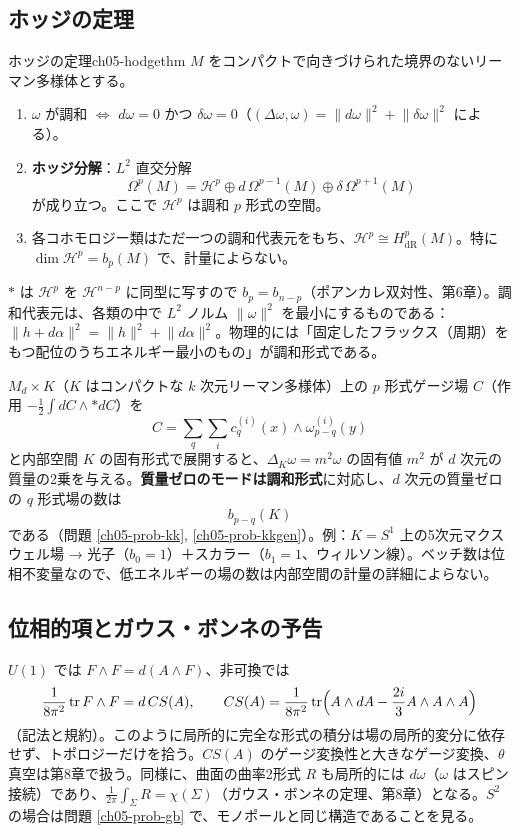 \subsection{ホッジの定理}
\begin{mythm}{ホッジの定理}{ch05-hodgethm}
$M$ をコンパクトで向きづけられた境界のないリーマン多様体とする。
\begin{enumerate}
\item $\omega$ が調和 $\iff$ $d\omega=0$ かつ $\delta\omega=0$（$(\Delta\omega,\omega)=\lVert d\omega\rVert^2+\lVert\delta\omega\rVert^2$ による）。
\item \textbf{ホッジ分解}：$L^2$ 直交分解
\[
\Omega^p(M)=\mathcal H^p\oplus d\,\Omega^{p-1}(M)\oplus\delta\,\Omega^{p+1}(M)
\]
が成り立つ。ここで $\mathcal H^p$ は調和 $p$ 形式の空間。
\item 各コホモロジー類はただ一つの調和代表元をもち、$\mathcal H^p\cong H^p_{\mathrm{dR}}(M)$。特に $\dim\mathcal H^p=b_p(M)$ で、計量によらない。
\end{enumerate}
\end{mythm}
${*}$ は $\mathcal H^p$ を $\mathcal H^{n-p}$ に同型に写すので $b_p=b_{n-p}$（ポアンカレ双対性、第6章）。調和代表元は、各類の中で $L^2$ ノルム $\lVert\omega\rVert^2$ を最小にするものである：$\lVert h+d\alpha\rVert^2=\lVert h\rVert^2+\lVert d\alpha\rVert^2$。物理的には「固定したフラックス（周期）をもつ配位のうちエネルギー最小のもの」が調和形式である。

\begin{physbox}
$M_d\times K$（$K$ はコンパクトな $k$ 次元リーマン多様体）上の $p$ 形式ゲージ場 $C$（作用 $-\tfrac12\int dC\wedge{*dC}$）を
\[
C=\sum_{q}\sum_{i} c^{(i)}_q(x)\wedge\omega^{(i)}_{p-q}(y)
\]
と内部空間 $K$ の固有形式で展開すると、$\Delta_K\omega=m^2\omega$ の固有値 $m^2$ が $d$ 次元の質量の2乗を与える。\textbf{質量ゼロのモードは調和形式}に対応し、$d$ 次元の質量ゼロの $q$ 形式場の数は
\[
b_{p-q}(K)
\]
である（問題 \ref{ch05-prob-kk}, \ref{ch05-prob-kkgen}）。例：$K=S^1$ 上の5次元マクスウェル場 → 光子（$b_0=1$）＋スカラー（$b_1=1$、ウィルソン線）。ベッチ数は位相不変量なので、低エネルギーの場の数は内部空間の計量の詳細によらない。
\end{physbox}

\subsection{位相的項とガウス・ボンネの予告}
$U(1)$ では $F\wedge F=d(A\wedge F)$、非可換では
\[
\frac{1}{8\pi^2}\tr F\wedge F=d\,CS(A),\qquad CS(A)=\frac{1}{8\pi^2}\tr\Bigl(A\wedge dA-\frac{2i}{3}A\wedge A\wedge A\Bigr)
\]
（記法と規約）。このように局所的に完全な形式の積分は場の局所的変分に依存せず、トポロジーだけを拾う。$CS(A)$ のゲージ変換性と大きなゲージ変換、$\theta$ 真空は第8章で扱う。同様に、曲面の曲率2形式 $R$ も局所的には $d\omega$（$\omega$ はスピン接続）であり、$\frac{1}{2\pi}\int_\Sigma R=\chi(\Sigma)$（ガウス・ボンネの定理、第8章）となる。$S^2$ の場合は問題 \ref{ch05-prob-gb} で、モノポールと同じ構造であることを見る。

